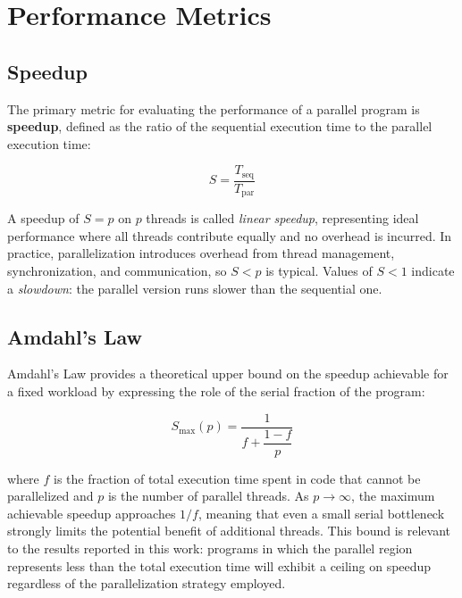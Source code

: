 \section{Performance Metrics}
\label{sec:speedup}

\subsection{Speedup}
\label{subsec:speedup}

The primary metric for evaluating the performance of a parallel program is \textbf{speedup}, defined as the ratio of the sequential execution time to the parallel execution time:

\begin{equation}
S = \frac{T_{\text{seq}}}{T_{\text{par}}}
\label{eq:speedup}
\end{equation}

A speedup of $S = p$ on $p$ threads is called \textit{linear speedup}, representing ideal performance where all threads contribute equally and no overhead is incurred. In practice, parallelization introduces overhead from thread management, synchronization, and communication, so $S < p$ is typical. Values of $S < 1$ indicate a \textit{slowdown}: the parallel version runs slower than the sequential one.

\subsection{Amdahl's Law}
\label{subsec:amdahl}

Amdahl's Law  provides a theoretical upper bound on the speedup achievable for a fixed workload by expressing the role of the serial fraction of the program:

\begin{equation}
S_{\max}(p) = \frac{1}{f + \dfrac{1 - f}{p}}
\label{eq:amdahl}
\end{equation}

\noindent where $f$ is the fraction of total execution time spent in code that cannot be parallelized and $p$ is the number of parallel threads. As $p \to \infty$, the maximum achievable speedup approaches $1/f$, meaning that even a small serial bottleneck strongly limits the potential benefit of additional threads. This bound is relevant to the results reported in this work: programs in which the parallel region represents less than the total execution time will exhibit a ceiling on speedup regardless of the parallelization strategy employed.

